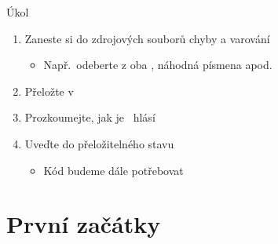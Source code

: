 \begin{frame}{Úkol}

  \begin{enumerate}
    \item Zaneste si do zdrojových souborů chyby a varování
    \begin{itemize}
      \item Např.\ odeberte z  oba , náhodná
	písmena apod.
    \end{itemize}

    \item Přeložte v \qtcu
    \item Prozkoumejte, jak je \qtc\ hlásí

    \item Uveďte do přeložitelného stavu
    \begin{itemize}
      \item Kód budeme dále potřebovat
    \end{itemize}
  \end{enumerate}

\end{frame}

\section{První začátky}
\frame{\sectionpage}

